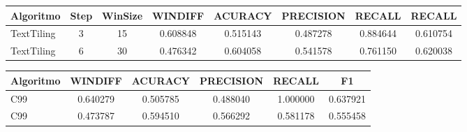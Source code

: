\documentclass{article}
\begin{document}
 

\begin{longtable}[c]{|l|c|c|c|c|c|c|c|} 
\hline 
Algoritmo & Step & WinSize & WINDIFF & ACURACY & PRECISION & RECALL & RECALL\\ \hline 
TextTiling & 3 & 15 & 0.608848 & 0.515143 & 0.487278 & 0.884644 & 0.610754 \\ \hline 
TextTiling & 6 & 30 & 0.476342 & 0.604058 & 0.541578 & 0.761150 & 0.620038 \\ \hline 
\end{longtable} 


\begin{longtable}[c]{|l|c|c|c|c|c|} 
\hline 
Algoritmo & WINDIFF & ACURACY & PRECISION & RECALL & F1\\ \hline 
C99 & 0.640279 & 0.505785 & 0.488040 & 1.000000 & 0.637921 \\ \hline 
C99 & 0.473787 & 0.594510 & 0.566292 & 0.581178 & 0.555458 \\ \hline 
\end{longtable} 
\end{document}
